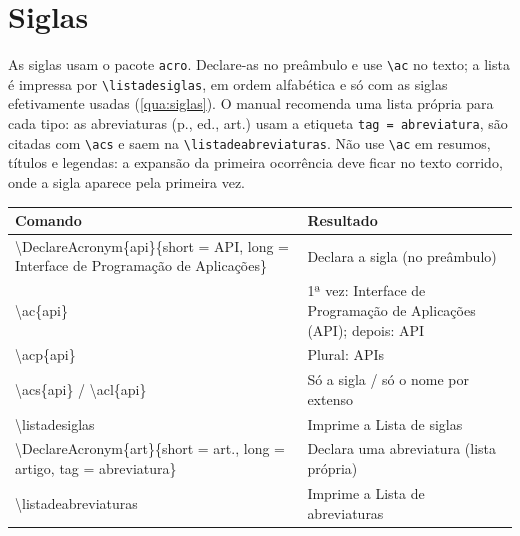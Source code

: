 \section{Siglas}

As siglas usam o pacote \texttt{acro}. Declare-as no preâmbulo e use \texttt{\textbackslash ac}
no texto; a lista é impressa por \texttt{\textbackslash listadesiglas}, em ordem alfabética
e só com as siglas efetivamente usadas (\autoref{qua:siglas}). O manual recomenda uma
lista própria para cada tipo: as abreviaturas (p., ed., art.) usam a etiqueta
\texttt{tag = abreviatura}, são citadas com \texttt{\textbackslash acs} e saem na
\texttt{\textbackslash listadeabreviaturas}. Não use \texttt{\textbackslash ac} em resumos,
títulos e legendas: a expansão da primeira ocorrência deve ficar no texto corrido, onde a
sigla aparece pela primeira vez.

\begin{quadro}[htbp]
\begin{ilustracao}{\caption[Comandos de siglas (pacote acro)]{Comandos de siglas (pacote \texttt{acro})}\label{qua:siglas}}{\elaboracaopropria}
  \renewcommand{\arraystretch}{1.2}
  \small
  \begin{tabularx}{\textwidth}{|>{\ttfamily\raggedright\arraybackslash}p{6.8cm}|X|}
    \hline
    \textnormal{\textbf{Comando}} & \textbf{Resultado} \\
    \hline
    \textbackslash DeclareAcronym\{api\}\{short = API, long = Interface de Programação de Aplicações\} & Declara a sigla (no preâmbulo) \\
    \hline
    \textbackslash ac\{api\} & 1ª vez: Interface de Programação de Aplicações (API); depois: API \\
    \hline
    \textbackslash acp\{api\} & Plural: APIs \\
    \hline
    \textbackslash acs\{api\} / \textbackslash acl\{api\} & Só a sigla / só o nome por extenso \\
    \hline
    \textbackslash listadesiglas & Imprime a Lista de siglas \\
    \hline
    \textbackslash DeclareAcronym\{art\}\{short = art., long = artigo, tag = abreviatura\} & Declara uma abreviatura (lista própria) \\
    \hline
    \textbackslash listadeabreviaturas & Imprime a Lista de abreviaturas \\
    \hline
  \end{tabularx}
\end{ilustracao}
\end{quadro}

